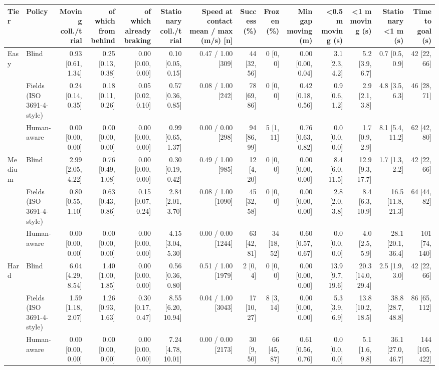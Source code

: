 \begin{tabular}{llrrrrrrrrrrrr}
\toprule
Tier & Policy & Moving coll./trial & of which from behind & of which already braking & Stationary coll./trial & Speed at contact mean / max (m/s) [n] & Success (\%) & Frozen (\%) & Min gap moving (m) & <0.5 m moving (s) & <1 m moving (s) & Stationary <1 m (s) & Time to goal (s) \\
\midrule
Easy & Blind & 0.93 [0.61, 1.34] & 0.25 [0.13, 0.38] & 0.00 [0.00, 0.00] & 0.10 [0.05, 0.15] & 0.47 / 1.00 [309] & 44 [32, 56] & 0 [0, 0] & 0.00 [0.00, 0.04] & 3.1 [2.3, 4.2] & 5.2 [3.9, 6.7] & 0.7 [0.5, 0.9] & 42 [22, 66] \\
 & Fields (ISO 3691-4-style) & 0.24 [0.14, 0.35] & 0.18 [0.11, 0.26] & 0.05 [0.02, 0.10] & 0.57 [0.36, 0.85] & 0.08 / 1.00 [242] & 78 [69, 86] & 0 [0, 0] & 0.42 [0.18, 0.56] & 0.9 [0.6, 1.2] & 2.9 [2.1, 3.8] & 4.8 [3.5, 6.3] & 46 [28, 71] \\
 & Human-aware & 0.00 [0.00, 0.00] & 0.00 [0.00, 0.00] & 0.00 [0.00, 0.00] & 0.99 [0.65, 1.37] & 0.00 / 0.00 [298] & 94 [86, 99] & 5 [1, 11] & 0.76 [0.63, 0.82] & 0.0 [0.0, 0.0] & 1.7 [0.9, 2.9] & 8.1 [5.4, 11.2] & 62 [42, 80] \\
\midrule
Medium & Blind & 2.99 [2.05, 4.22] & 0.76 [0.49, 1.08] & 0.00 [0.00, 0.00] & 0.30 [0.19, 0.42] & 0.49 / 1.00 [985] & 12 [4, 20] & 0 [0, 0] & 0.00 [0.00, 0.00] & 8.4 [6.0, 11.5] & 12.9 [9.3, 17.7] & 1.7 [1.3, 2.2] & 42 [22, 66] \\
 & Fields (ISO 3691-4-style) & 0.80 [0.55, 1.10] & 0.63 [0.43, 0.86] & 0.15 [0.07, 0.24] & 2.84 [2.01, 3.70] & 0.08 / 1.00 [1090] & 45 [32, 58] & 0 [0, 0] & 0.00 [0.00, 0.00] & 2.8 [2.0, 3.8] & 8.4 [6.3, 10.9] & 16.5 [11.8, 21.3] & 64 [44, 82] \\
 & Human-aware & 0.00 [0.00, 0.00] & 0.00 [0.00, 0.00] & 0.00 [0.00, 0.00] & 4.15 [3.04, 5.30] & 0.00 / 0.00 [1244] & 63 [42, 81] & 34 [18, 52] & 0.60 [0.57, 0.67] & 0.0 [0.0, 0.0] & 4.0 [2.5, 5.9] & 28.1 [20.1, 36.4] & 101 [74, 140] \\
\midrule
Hard & Blind & 6.04 [4.29, 8.54] & 1.40 [1.00, 1.85] & 0.00 [0.00, 0.00] & 0.56 [0.36, 0.80] & 0.51 / 1.00 [1979] & 2 [0, 4] & 0 [0, 0] & 0.00 [0.00, 0.00] & 13.9 [9.7, 19.6] & 20.3 [14.0, 29.4] & 2.5 [1.9, 3.0] & 42 [22, 66] \\
 & Fields (ISO 3691-4-style) & 1.59 [1.18, 2.07] & 1.26 [0.93, 1.63] & 0.30 [0.17, 0.47] & 8.55 [6.20, 10.94] & 0.04 / 1.00 [3043] & 17 [10, 27] & 8 [3, 14] & 0.00 [0.00, 0.00] & 5.3 [3.9, 6.9] & 13.8 [10.2, 18.5] & 38.8 [28.7, 48.8] & 86 [65, 112] \\
 & Human-aware & 0.00 [0.00, 0.00] & 0.00 [0.00, 0.00] & 0.00 [0.00, 0.00] & 7.24 [4.78, 10.01] & 0.00 / 0.00 [2173] & 30 [9, 50] & 66 [45, 87] & 0.61 [0.56, 0.76] & 0.0 [0.0, 0.0] & 5.1 [1.6, 9.8] & 36.1 [27.0, 46.7] & 144 [105, 422] \\
\bottomrule
\end{tabular}
